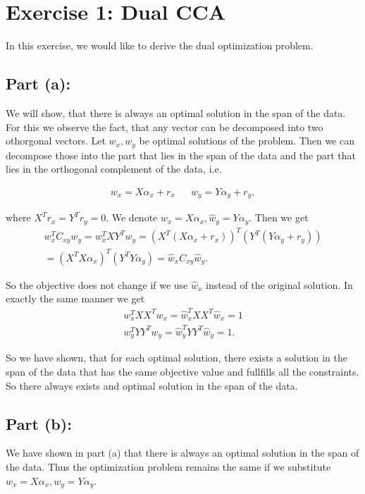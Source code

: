 \section*{Exercise 1: Dual CCA}

In this exercise, we would like to derive the dual optimization problem.

\subsection*{Part (a):}

We will show, that there is always an optimal solution in the span of the data.
For this we observe the fact, that any vector can be decomposed into two othorgonal vectors. Let $w_x, w_y$ be optimal solutions of the problem.
Then we can decompose those into the part that lies in the span of the data and the part that lies in the orthogonal complement of the data, i.e.

\begin{align*}
	w_x = X\alpha_x + r_x && w_y = Y\alpha_y + r_y,
\end{align*}

where $X^Tr_x = Y^Tr_y = 0$. We denote $\hat w_x = X\alpha_x, \hat w_y = Y\alpha_y$. Then we get
\begin{align*}
	w_x^T C_{xy} w_y = w_x^T X Y^T w_y = (X^T(X\alpha_x + r_x))^T(Y^T(Y\alpha_y + r_y))\\ = (X^TX\alpha_x)^T(Y^TY\alpha_y) = \hat w_x C_{xy} \hat w_y.
\end{align*}

So the objective does not change if we use $\hat w_x$ instead of the original solution.
In exactly the same manner we get
\begin{align*}
	w_x^T XX^T w_x = \hat w_x^T XX^T \hat w_x = 1 \\
	w_y^T YY^T w_y = \hat w_y^T YY^T \hat w_y = 1.
\end{align*}

So we have shown, that for each optimal solution, there exists a solution in the span of the data that has the same objective value and fullfills all the constraints. So there always exists and optimal solution in the span of the data. 

\subsection*{Part (b):}

We have shown in part (a) that there is always an optimal solution in the span of the data. Thus the optimization problem remains the same if we substitute $w_x = X\alpha_x, w_y = Y \alpha_y$. 

